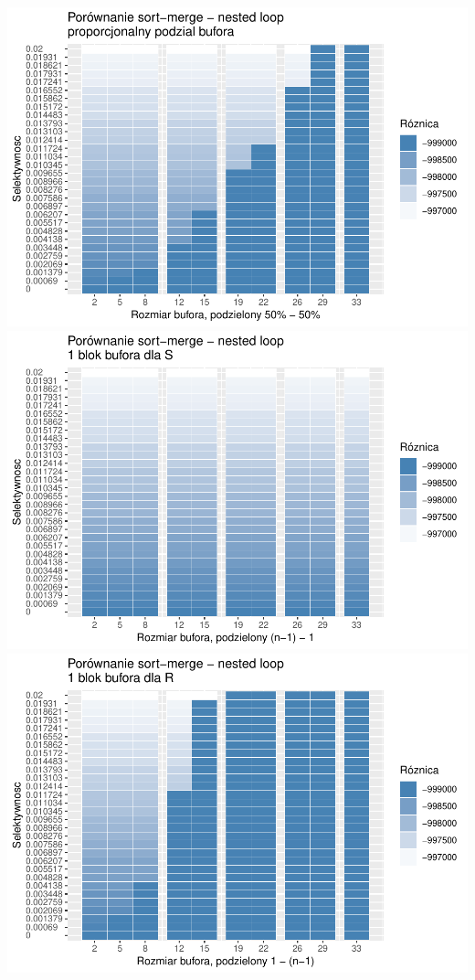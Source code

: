 \documentclass[]{article}
\begin{document}
\includegraphics{report_files/figure-latex/plots-1.pdf}
\includegraphics{report_files/figure-latex/plots-2.pdf}
\includegraphics{report_files/figure-latex/plots-3.pdf} \vspace{2mm}
\end{document}
